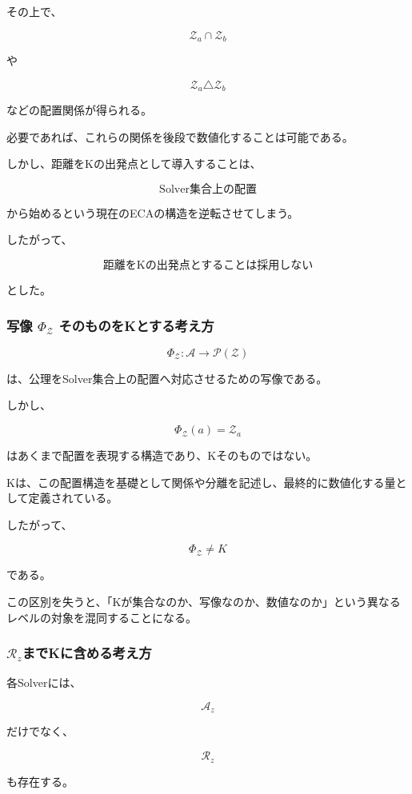 その上で、

\[
\mathcal{Z}_a\cap\mathcal{Z}_b
\]

や

\[
\mathcal{Z}_a\triangle\mathcal{Z}_b
\]

などの配置関係が得られる。

必要であれば、これらの関係を後段で数値化することは可能である。

しかし、距離をKの出発点として導入することは、

\[
\text{Solver集合上の配置}
\]

から始めるという現在のECAの構造を逆転させてしまう。

したがって、

\[
\boxed{
\text{距離をKの出発点とすることは採用しない}
}
\]

とした。

\subsubsection{写像 $\Phi_{\mathcal{Z}}$ そのものをKとする考え方}

\[
\Phi_{\mathcal{Z}}:\mathcal{A}\longrightarrow\mathcal{P}(\mathcal{Z})
\]

は、公理をSolver集合上の配置へ対応させるための写像である。

しかし、

\[
\Phi_{\mathcal{Z}}(a)=\mathcal{Z}_a
\]

はあくまで配置を表現する構造であり、Kそのものではない。

Kは、この配置構造を基礎として関係や分離を記述し、最終的に数値化する量として定義されている。

したがって、

\[
\boxed{
\Phi_{\mathcal{Z}}\neq K
}
\]

である。

この区別を失うと、「Kが集合なのか、写像なのか、数値なのか」という異なるレベルの対象を混同することになる。

\subsubsection{$\mathcal{R}_z$までKに含める考え方}

各Solverには、

\[
\mathcal{A}_z
\]

だけでなく、

\[
\mathcal{R}_z
\]

も存在する。

